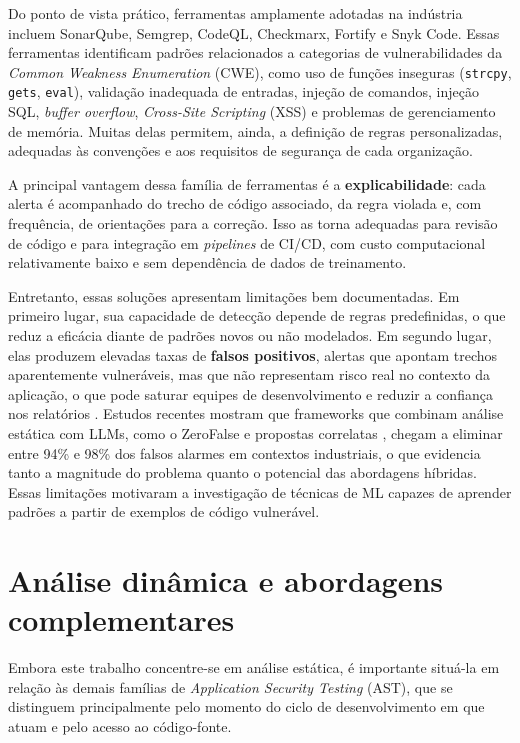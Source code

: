Do ponto de vista prático, ferramentas amplamente adotadas na indústria
incluem SonarQube, Semgrep, CodeQL, Checkmarx, Fortify e Snyk Code.
Essas ferramentas identificam padrões relacionados a categorias de
vulnerabilidades da \textit{Common Weakness Enumeration} (CWE), como uso
de funções inseguras (\texttt{strcpy}, \texttt{gets}, \texttt{eval}),
validação inadequada de entradas, injeção de comandos, injeção SQL,
\textit{buffer overflow}, \textit{Cross-Site Scripting} (XSS) e problemas
de gerenciamento de memória. Muitas delas permitem, ainda, a definição
de regras personalizadas, adequadas às convenções e aos requisitos de
segurança de cada organização.

A principal vantagem dessa família de ferramentas é a
\textbf{explicabilidade}: cada alerta é acompanhado do trecho de código
associado, da regra violada e, com frequência, de orientações para a
correção. Isso as torna adequadas para revisão de código e para
integração em \textit{pipelines} de CI/CD, com custo computacional
relativamente baixo e sem dependência de dados de treinamento.

Entretanto, essas soluções apresentam limitações bem documentadas. Em
primeiro lugar, sua capacidade de detecção depende de regras
predefinidas, o que reduz a eficácia diante de padrões novos ou não
modelados. Em segundo lugar, elas produzem elevadas taxas de
\textbf{falsos positivos}, alertas que apontam trechos aparentemente
vulneráveis, mas que não representam risco real no contexto da aplicação, o que pode saturar equipes de desenvolvimento e reduzir a confiança nos
relatórios \cite{techscience2025,yang2025}. Estudos recentes mostram que
frameworks que combinam análise estática com LLMs, como o ZeroFalse
\cite{yang2025} e propostas correlatas \cite{wen2025falsealarm}, chegam a
eliminar entre 94\% e 98\% dos falsos alarmes em contextos industriais,
o que evidencia tanto a magnitude do problema quanto o potencial das
abordagens híbridas. Essas limitações motivaram a investigação de
técnicas de ML capazes de aprender padrões a partir de exemplos de código
vulnerável.

\section{Análise dinâmica e abordagens complementares}
\label{sec:analise_dinamica}

Embora este trabalho concentre-se em análise estática, é importante
situá-la em relação às demais famílias de \textit{Application Security
Testing} (AST), que se distinguem principalmente pelo momento do ciclo
de desenvolvimento em que atuam e pelo acesso ao código-fonte.

